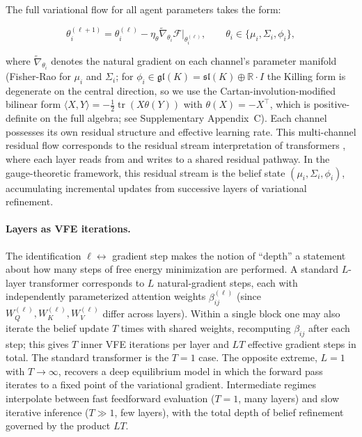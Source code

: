 \documentclass[twoside,11pt]{article}
\begin{document}
The full variational flow for all agent parameters takes the form:

\begin{equation}
\theta_i^{(\ell+1)} = \theta_i^{(\ell)} - \eta_\theta \tilde{\nabla}_{\theta_i}\mathcal{F}\bigg|_{\theta_i^{(\ell)}}, \qquad \theta_i \in \{\mu_i, \Sigma_i, \phi_i\},
\end{equation}

where $\tilde{\nabla}_{\theta_i}$ denotes the natural gradient on each channel's parameter manifold (Fisher-Rao for $\mu_i$ and $\Sigma_i$; for $\phi_i \in \mathfrak{gl}(K) = \mathfrak{sl}(K)\oplus\mathbb{R}\cdot I$ the Killing form is degenerate on the central direction, so we use the Cartan-involution-modified bilinear form $\langle X, Y\rangle = -\tfrac{1}{2}\operatorname{tr}(X\theta(Y))$ with $\theta(X) = -X^\top$, which is positive-definite on the full algebra; see Supplementary Appendix~C). Each channel possesses its own residual structure and effective learning rate. This multi-channel residual flow corresponds to the residual stream interpretation of transformers \citep{elhage2021mathematical}, where each layer reads from and writes to a shared residual pathway. In the gauge-theoretic framework, this residual stream is the belief state $(\mu_i, \Sigma_i, \phi_i)$, accumulating incremental updates from successive layers of variational refinement.

\paragraph{Layers as VFE iterations.}
The identification $\ell \leftrightarrow$ gradient step makes the notion of ``depth'' a statement about how many steps of free energy minimization are performed. A standard $L$-layer transformer corresponds to $L$ natural-gradient steps, each with independently parameterized attention weights $\beta_{ij}^{(\ell)}$ (since $W_Q^{(\ell)}, W_K^{(\ell)}, W_V^{(\ell)}$ differ across layers). Within a single block one may also iterate the belief update $T$ times with shared weights, recomputing $\beta_{ij}$ after each step; this gives $T$ inner VFE iterations per layer and $LT$ effective gradient steps in total. The standard transformer is the $T=1$ case. The opposite extreme, $L=1$ with $T\to\infty$, recovers a deep equilibrium model \citep{bai2019deep} in which the forward pass iterates to a fixed point of the variational gradient. Intermediate regimes interpolate between fast feedforward evaluation ($T=1$, many layers) and slow iterative inference ($T\gg 1$, few layers), with the total depth of belief refinement governed by the product $LT$.
\end{document}
